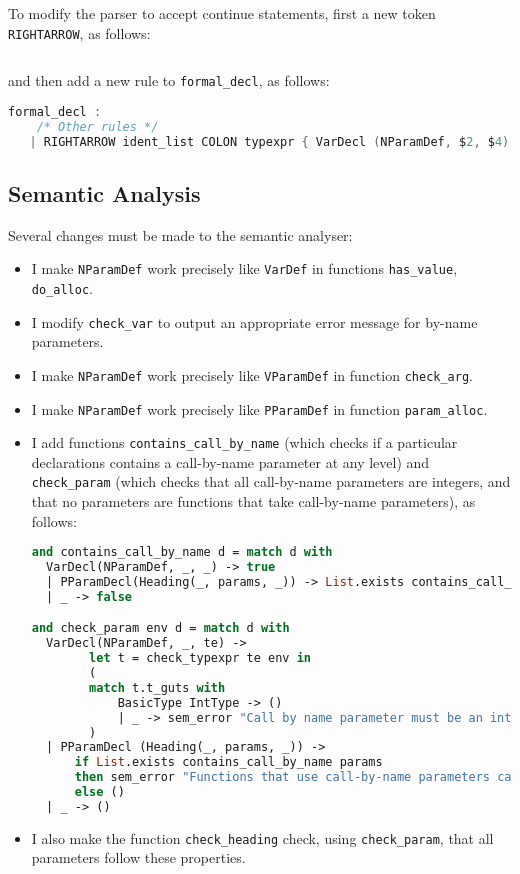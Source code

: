\documentclass[a4paper,9pt]{article}
\begin{document}
To modify the parser to accept continue statements, first a new token \texttt{RIGHTARROW}, as follows:

\begin{lstlisting}[language=c]
%token                  RIGHTARROW
\end{lstlisting}

and then add a new rule to \texttt{formal\_decl}, as follows:

\begin{lstlisting}[language=c]
formal_decl :   
    /* Other rules */
   | RIGHTARROW ident_list COLON typexpr { VarDecl (NParamDef, $2, $4) }
\end{lstlisting}

\subsection{Semantic Analysis}
Several changes must be made to the semantic analyser:
\begin{itemize}
    \item I make \texttt{NParamDef} work precisely like \texttt{VarDef} in functions \texttt{has\_value}, \texttt{do\_alloc}.
    \item I modify \texttt{check\_var} to output an appropriate error message for by-name parameters.
    \item I make \texttt{NParamDef} work precisely like \texttt{VParamDef} in function \texttt{check\_arg}.
    \item I make \texttt{NParamDef} work precisely like \texttt{PParamDef} in function \texttt{param\_alloc}.
    \item I add functions \texttt{contains\_call\_by\_name} (which checks if a particular declarations contains a call-by-name parameter at any level) and \texttt{check\_param} (which checks that all call-by-name parameters are integers, and that no parameters are functions that take call-by-name parameters), as follows:
\begin{lstlisting}[language=ml]
and contains_call_by_name d = match d with
  VarDecl(NParamDef, _, _) -> true
  | PParamDecl(Heading(_, params, _)) -> List.exists contains_call_by_name params
  | _ -> false

and check_param env d = match d with
  VarDecl(NParamDef, _, te) ->
        let t = check_typexpr te env in
        (
        match t.t_guts with
            BasicType IntType -> ()
            | _ -> sem_error "Call by name parameter must be an integer" []
        )
  | PParamDecl (Heading(_, params, _)) ->
      if List.exists contains_call_by_name params
      then sem_error "Functions that use call-by-name parameters cannot be parameters" []
      else ()
  | _ -> ()
\end{lstlisting}
    \item I also make the function \texttt{check\_heading} check, using \texttt{check\_param}, that all parameters follow these properties.
\end{itemize}
\end{document}
